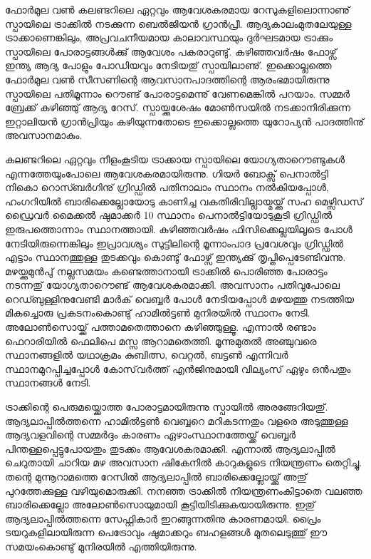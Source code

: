 ﻿
\vskip 2pt

ഫോര്‍മുല വണ്‍ കലണ്ടറിലെ ഏറ്റവും ആവേശകരമായ റേസുകളിലൊന്നാണു് സ്പായിലെ ട്രാക്കില്‍ നടക്കുന്ന 
ബെല്‍ജിയന്‍ ഗ്രാന്‍പ്രീ. ആദ്യകാലംമുതലേയുള്ള ട്രാക്കാണെങ്കിലും, അപ്രവചനീയമായ കാലാവസ്ഥയും ദുര്‍ഘടമായ 
ട്രാക്കും സ്പായിലെ പോരാട്ടങ്ങള്‍ക്കു് ആവേശം പകരാറുണ്ടു്. കഴിഞ്ഞവര്‍ഷം ഫോഴ്സ് ഇന്ത്യ ആദ്യ പോളും പോഡിയവും 
നേടിയതു് സ്പായിലാണു്. ഇക്കൊല്ലത്തെ ഫോര്‍മുല വണ്‍ സീസണിന്റെ ആവസാനപാദത്തിന്റെ ആരംഭമായിരുന്നു 
സ്പായിലെ പതിമൂന്നാം റൌണ്ട് പോരാട്ടമെന്നു് വേണമെങ്കില്‍ പറയാം. സമ്മര്‍ ബ്രേക്ക് കഴിഞ്ഞു് ആദ്യ റേസ്. 
സ്പായ്ക്കുശേഷം മോണ്‍സയില്‍ നടക്കാനിരിക്കുന്ന ഇറ്റാലിയന്‍ ഗ്രാന്‍പ്രിയും കഴിയുന്നതോടെ ഇക്കൊല്ലത്തെ യുറോപ്യന്‍ 
പാദത്തിനു് അവസാനമാകും.

കലണ്ടറിലെ ഏറ്റവും നീളംകൂടിയ ട്രാക്കായ സ്പായിലെ യോഗ്യതാറൌണ്ടുകള്‍ എന്നത്തേയുംപോലെ 
ആവേശകരമായിരുന്നു. ഗിയര്‍ ബോക്സ് പെനാല്‍ട്ടി നികൊ റൊസ്ബര്‍ഗിനു് ഗ്രിഡ്ഡില്‍ പതിനാലാം സ്ഥാനം 
നല്‍കിയപ്പോള്‍, ഹംഗറിയില്‍ ബാരിക്കെല്ലോയോടു കാണിച്ച വകതിരിവില്ലായ്മയ്ക്കു് സഹ മെഴ്സിഡസ് ഡ്രൈവര്‍ മൈക്കല്‍ 
ഷുമാക്കര്‍ 10 സ്ഥാനം പെനാല്‍ട്ടിയോടുകൂടി ഗ്രിഡ്ഡില്‍ ഇരുപത്തൊന്നാം സ്ഥാനത്തായി. കഴിഞ്ഞവര്‍ഷം ഫിസിക്കെല്ലയിലൂടെ 
പോള്‍ നേടിയിരുന്നെങ്കിലും ഇപ്രാവശ്യം സുട്ടിലിന്റെ മൂന്നാംപാദ പ്രവേശവും ഗ്രിഡ്ഡില്‍ എട്ടാം സ്ഥാനത്തുള്ള തുടക്കവും 
കൊണ്ടു് ഫോഴ്സ് ഇന്ത്യക്കു് തൃപ്തിപ്പെടേണ്ടിവന്നു. മഴയ്ക്കുമുന്‍പു് നല്ലസമയം കണ്ടെത്താനായി ട്രാക്കില്‍ പൊരിഞ്ഞ പോരാട്ടം 
നടന്നതു് യോഗ്യതാറൌണ്ട് ആവേശകരമാക്കി. അവസാനം പതിവുപോലെ റെഡ്ബുള്ളിനുവേണ്ടി മാര്‍ക് വെബ്ബര്‍ 
പോള്‍ നേടിയപ്പോള്‍ മഴയത്തു നടത്തിയ മികച്ചൊരു പ്രകടനംകൊണ്ടു് ഹാമില്‍ട്ടണ്‍ മുനിരയില്‍ സ്ഥാനം നേടി. 
അലോണ്‍സൊയ്ക്ക് പത്താമതെത്താനെ കഴിഞ്ഞുള്ളൂ. എന്നാല്‍ രണ്ടാം ഫെറാരിയില്‍ ഫെലിപെ മസ്സ ആറാമതെത്തി. 
മൂന്നുമുതല്‍ അഞ്ചുവരെ സ്ഥാനങ്ങളില്‍ യഥാക്രമം കുബിത്സ, വെറ്റല്‍, ബട്ടണ്‍ എന്നിവര്‍ സ്ഥാനമുറപ്പിച്ചപ്പോള്‍ 
കോസ്‌വര്‍ത്ത് എന്‍ജിനുമായി വില്യംസ് ഏഴും ഒന്‍പതും സ്ഥാനങ്ങള്‍ നേടി.

ട്രാക്കിന്റെ പെരുമയ്ക്കൊത്ത പോരാട്ടമായിരുന്നു സ്പായില്‍ അരങ്ങേറിയതു്. ആദ്യലാപ്പില്‍ത്തന്നെ ഹാമില്‍ട്ടണ്‍ വെബ്ബറെ 
മറികടന്നതും വളരെ അടുത്തുള്ള ആദ്യവളവിന്റെ സമ്മര്‍ദ്ദം കാരണം ഏഴാംസ്ഥാനത്തേയ്ക്ക് വെബ്ബര്‍ 
പിന്തള്ളപ്പെട്ടുപോയതും തുടക്കം ആവേശകരമാക്കി. എന്നാല്‍ ആദ്യലാപ്പില്‍ ചെറുതായി ചാറിയ മഴ അവസാന 
ഷികേനില്‍ കാറുകളുടെ നിയന്ത്രണം തെറ്റിച്ചു. തന്റെ മുന്നൂറാമത്തെ റേസില്‍ ആദ്യലാപ്പില്‍ ബാരിക്കെല്ലോയ്ക്കു് അതു് 
പുറത്തേക്കുള്ള വഴിയുമൊരുക്കി. നനഞ്ഞ ട്രാക്കില്‍ നിയന്ത്രണംകിട്ടാതെ വലഞ്ഞ ബാരിക്കെല്ലോ അലോണ്‍സൊയുമായി 
കൂട്ടിയിടിക്കുകയായിരുന്നു. ഇതു് ആദ്യലാപ്പില്‍ത്തന്നെ സേഫ്റ്റികാര്‍ ഇറങ്ങുന്നതിനു കാരണമായി. പ്രൈം 
ടയറുകളിലായിരുന്ന പെട്രോവും ഷുമാക്കറും ബഹളങ്ങള്‍ മുതലെടുത്തു് ഈ സമയംകൊണ്ടു് മുനിരയില്‍ 
എത്തിയിരുന്നു.

